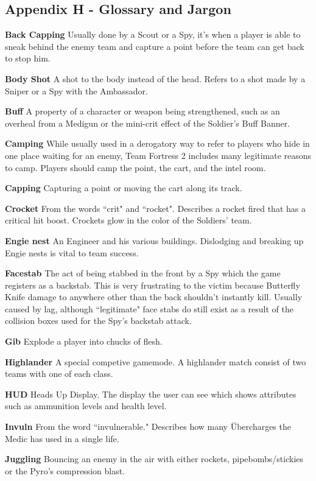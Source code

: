 \subsection{Appendix H - Glossary and Jargon}
\label{Glossary}

{\bf Back Capping} Usually done by a Scout or a Spy, it’s when a player is able to sneak behind the enemy team and capture a point before the team can get back to stop him.

{\bf Body Shot} A shot to the body instead of the head. Refers to a shot made by a Sniper or a Spy with the Ambassador. 

{\bf Buff} A property of a character or weapon being strengthened, such as an overheal from a Medigun or the mini-crit effect of the Soldier's Buff Banner.

{\bf Camping} While usually used in a derogatory way to refer to players who hide in one place waiting for an enemy, Team Fortress 2 includes many legitimate reasons to camp. Players should camp the point, the cart, and the intel room.

{\bf Capping} Capturing a point or moving the cart along its track.

{\bf Crocket} From the words “crit" and “rocket". Describes a rocket fired that has a critical hit boost. Crockets glow in the color of the Soldiers' team.

{\bf Engie nest} An Engineer and his various buildings. Dislodging and breaking up Engie nests is vital to team success. 

{\bf Facestab} The act of being stabbed in the front by a Spy which the game registers as a backstab. This is very frustrating to the victim because Butterfly Knife damage to anywhere other than the back shouldn't instantly kill. Usually caused by lag, although “legitimate" face stabs do still exist as a result of the collision boxes used for the Spy's backstab attack. 

{\bf Gib} Explode a player into chucks of flesh.

{\bf Highlander} A special competive gamemode. A highlander match consist of two teams with one of each class.

{\bf HUD} Heads Up Display. The display the user can see which shows attributes such as ammunition levels and health level.

{\bf Invuln} From the word “invulnerable." Describes how many Übercharges the Medic has used in a single life.  

{\bf Juggling} Bouncing an enemy in the air with either rockets, pipebombs/stickies or the Pyro's compression blast.

